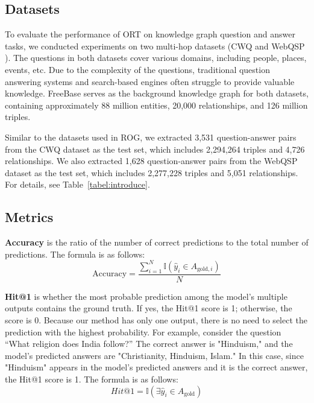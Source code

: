\subsection{Datasets}
To evaluate the performance of ORT on knowledge graph question and answer tasks, we conducted experiments on two multi-hop datasets (CWQ \cite{Talmor2018TheWA} and WebQSP \cite{Devlin2019BERTPO}). The questions in both datasets cover various domains, including people, places, events, etc. Due to the complexity of the questions, traditional question answering systems and search-based engines often struggle to provide valuable knowledge. FreeBase \cite{Bollacker2008FreebaseAC} serves as the background knowledge graph for both datasets, containing approximately 88 million entities, 20,000 relationships, and 126 million triples.

Similar to the datasets used in ROG, we extracted 3,531 question-answer pairs from the CWQ dataset as the test set, which includes 2,294,264 triples and 4,726 relationships. We also extracted 1,628 question-answer pairs from the WebQSP dataset as the test set, which includes 2,277,228 triples and 5,051 relationships. For details, see Table~\ref{tabel:introduce}.


\subsection{Metrics}
\textbf{Accuracy} is the ratio of the number of correct predictions to the total number of predictions. The formula is as follows:
\begin{equation}
\text{Accuracy} = \frac{\sum_{i=1}^{N} \mathbb{I}(\hat{y}_i \in A_{\text{gold},i})}{N}
\end{equation}

\textbf{Hit@1} is whether the most probable prediction among the model's multiple outputs contains the ground truth. If yes, the Hit@1 score is 1; otherwise, the score is 0. Because our method has only one output, there is no need to select the prediction with the highest probability. For example, consider the question “What religion does India follow?” The correct answer is "Hinduism," and the model’s predicted answers are "Christianity, Hinduism, Islam." In this case, since "Hinduism" appears in the model's predicted answers and it is the correct answer, the Hit@1 score is 1. The formula is as follows:
\begin{equation}
Hit@1 = \mathbb{I}(\exists \hat{y}_i \in A_{\text{gold}})
\end{equation}

